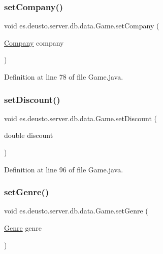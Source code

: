 \subsubsection{\texorpdfstring{set\+Company()}{setCompany()}}
{\footnotesize\ttfamily void es.\+deusto.\+server.\+db.\+data.\+Game.\+set\+Company (\begin{DoxyParamCaption}\item[{\hyperlink{classes_1_1deusto_1_1server_1_1db_1_1data_1_1_company}{Company}}]{company }\end{DoxyParamCaption})}



Definition at line 78 of file Game.\+java.

\mbox{\label{classes_1_1deusto_1_1server_1_1db_1_1data_1_1_game_a01bf7ea450f005d8d47701e7091c6931}} 
\subsubsection{\texorpdfstring{set\+Discount()}{setDiscount()}}
{\footnotesize\ttfamily void es.\+deusto.\+server.\+db.\+data.\+Game.\+set\+Discount (\begin{DoxyParamCaption}\item[{double}]{discount }\end{DoxyParamCaption})}



Definition at line 96 of file Game.\+java.

\mbox{\label{classes_1_1deusto_1_1server_1_1db_1_1data_1_1_game_a61d197148280723f018c7ef18e37cb7e}} 
\subsubsection{\texorpdfstring{set\+Genre()}{setGenre()}}
{\footnotesize\ttfamily void es.\+deusto.\+server.\+db.\+data.\+Game.\+set\+Genre (\begin{DoxyParamCaption}\item[{\hyperlink{classes_1_1deusto_1_1server_1_1db_1_1data_1_1_genre}{Genre}}]{genre }\end{DoxyParamCaption})}



